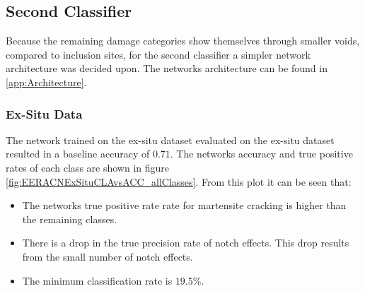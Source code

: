 \newpage
\subsection{Second Classifier}
Because the remaining damage categories show themselves through smaller voids, compared to inclusion sites, for the second classifier a simpler network architecture was decided upon. The networks architecture can be found in \ref{app:Architecture}.


%
%

\subsubsection{Ex-Situ Data}
The network trained on the ex-situ dataset evaluated on the ex-situ dataset resulted in a baseline accuracy of $0.71$. The networks accuracy and true positive rates of each class are shown in figure \ref{fig:EERACNExSituCLAvsACC_allClasses}. From this plot it can be seen that:
\begin{itemize}
\item The networks true positive rate rate for martensite cracking is higher than the remaining classes.
\item There is a drop in the true precision rate of notch effects. This drop results from the small number of notch effects.
\item The minimum classification rate is $19.5\%$. 
\end{itemize}

